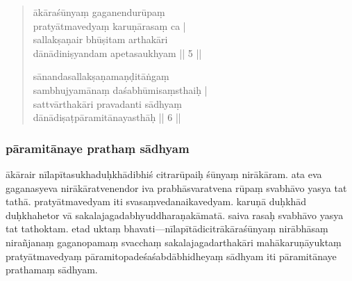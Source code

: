 \documentclass[12pt]{article}
\newcommand{\emdash} {\hspace{0em}—\hspace{0em}}
\begin{document}
\begin{quote}
	ākāraśūnyaṃ gaganendurūpaṃ \\
	pratyātmavedyaṃ karuṇārasaṃ ca |\\
	sallakṣaṇair bhūṣitam\footnoteB{
		bhūṣitam] \EDD ; bhuṣitam \MS
	} arthakāri \\
	dānādiniṣyandam apetasaukhyam || 5 ||
 
	sānandasallakṣaṇamaṇḍitāṅgaṃ \\
	sambhujyamānaṃ daśabhūmisaṃsthaiḥ |\\
	sattvārthakāri pravadanti sādhyaṃ \\
	dānādiṣaṭpāramitānayasthāḥ || 6 ||

\end{quote}

\subsubsection{pāramitānaye prathaṃ sādhyam}
\noindent ākārair nīlapītasukhaduḥkhādibhiś citrarūpaiḥ śūnyaṃ nirākāram.
ata eva gaganasyeva nirākāratvenendor iva prabhāsvaratvena rūpaṃ svabhāvo yasya tat tathā.
pratyātmavedyam iti svasaṃvedanaikavedyam.\footnoteB{
	svasaṃvedanaikavedyam] \EDD\ (\emd) (°vedyaṃ); svasaṃvedyanaikavedyaṃ \MS
}
karuṇā duḥkhād\footnoteB{
	karuṇā duḥkhād] \MS; karuṇāduḥkhā° \EDD
} duḥkhahetor vā sakalajagadabhyuddharaṇakāmatā.\footnoteB{
	abhyuddharaṇakāmatā] \emd ; °atyuddharaṇakāmatā \MS\ \EDD
}
saiva rasaḥ svabhāvo yasya tat tathoktam.
etad uktaṃ bhavati\emdash nīlapītādicitrākāraśūnyaṃ nirābhāsaṃ\footnoteB{
	nirābhāsaṃ] \emd ; nirābhāsa \MS\ \EDD
} nirañjanaṃ gaganopamaṃ svacchaṃ sakalajagadarthakāri mahākaruṇāyuktaṃ pratyātmavedyaṃ pāramitopadeśaśabdābhidheyaṃ sādhyam iti pāramitānaye prathamaṃ sādhyam.
\end{document}
